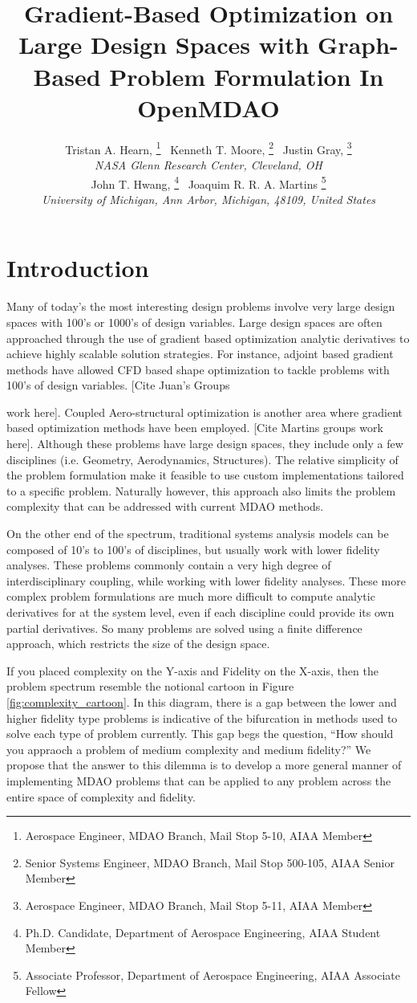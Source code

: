 \documentclass[]{aiaa-tc} %
\title{Gradient-Based Optimization on Large Design Spaces with Graph-Based Problem Formulation In OpenMDAO}
\author{
  Tristan A. Hearn,%
     \thanks{Aerospace Engineer, MDAO Branch, Mail Stop 5-10, AIAA Member}
  \ Kenneth T. Moore,%
     \thanks{Senior Systems Engineer, MDAO Branch, Mail Stop 500-105, AIAA Senior Member}
  \ Justin Gray,%
     \thanks{Aerospace Engineer, MDAO Branch, Mail Stop 5-11, AIAA Member}
   \\
  {\normalsize\itshape
  NASA Glenn Research Center, Cleveland, OH}  \\
  John T. Hwang,%
  \thanks{Ph.D. Candidate, Department of Aerospace Engineering, AIAA Student Member}
  \ Joaquim R. R. A. Martins%
  \thanks{Associate Professor, Department of Aerospace Engineering, AIAA Associate Fellow}
  \\
  {\normalsize\itshape
   University of Michigan, Ann Arbor, Michigan, 48109, United States}
}
\begin{document}
  \maketitle

  \begin{abstract}

  \end{abstract}

  \section{Introduction}

    Many of today's the most interesting design problems involve very large design spaces with 100's or 1000's of
    design variables. Large design spaces are often approached through the use of gradient based optimization
    analytic derivatives to achieve highly scalable solution strategies. For instance, adjoint based gradient
    methods have allowed CFD based shape optimization to tackle problems with 100's of design variables. [Cite Juan's Groups

    work here]. Coupled Aero-structural optimization is another area where gradient based optimization methods have
    been employed. [Cite Martins groups work here]. Although these problems have large design spaces,
    they include only a few disciplines (i.e. Geometry, Aerodynamics, Structures). The relative simplicity of
    the problem formulation make it feasible to use custom implementations tailored to a specific problem. Naturally however,
    this approach also limits the problem complexity that can be addressed with current MDAO methods.

    On the other end of the spectrum, traditional systems analysis models can be composed of 10's to 100's of disciplines,
    but usually work with lower fidelity analyses. These problems commonly contain a very high degree of interdisciplinary
    coupling, while working with lower fidelity analyses. These more complex problem formulations are much more difficult to compute
    analytic derivatives for at the system level, even if each discipline could provide its own partial derivatives. So many
    problems are solved using a finite difference approach, which restricts the size of the design space.

    If you placed complexity on the Y-axis and Fidelity on the X-axis, then the problem spectrum resemble the notional
    cartoon in Figure \ref{fig:complexity_cartoon}. In this diagram, there is a gap between the lower and higher fidelity
    type problems is indicative of the bifurcation in methods used to solve each type of problem currently. This gap begs the
    question, ``How should you appraoch a problem of medium complexity and medium fidelity?'' We propose that the answer to this
    dilemma is to develop a more general manner of implementing MDAO problems that can be applied to any problem across the entire
    space of complexity and fidelity.
\end{document}
